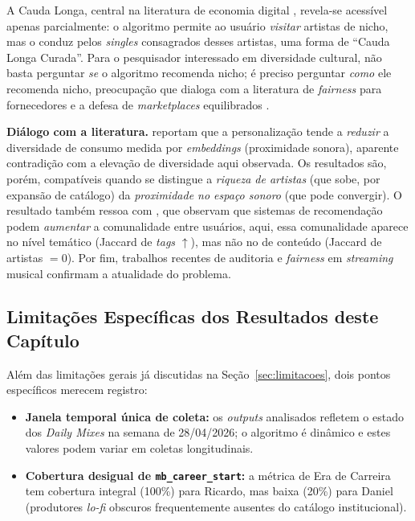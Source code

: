 \documentclass[12pt, %
openright,
oneside, %
a4paper,    %
english,   %
brazil]{facom-ufu-abntex2}
\begin{document}
A Cauda Longa, central na literatura de economia digital
\cite{anderson2006longtail}, revela-se acessível apenas parcialmente: o algoritmo
permite ao usuário \emph{visitar} artistas de nicho, mas o conduz pelos
\emph{singles} consagrados desses artistas, uma forma de ``Cauda Longa
Curada''. Para o pesquisador interessado em diversidade cultural, não basta
perguntar \emph{se} o algoritmo recomenda nicho; é preciso perguntar \emph{como}
ele recomenda nicho, preocupação que dialoga com a literatura de \emph{fairness}
para fornecedores e a defesa de \emph{marketplaces} equilibrados
\cite{mehrotra2018towards}.

\textbf{Diálogo com a literatura.}  reportam
que a personalização tende a \emph{reduzir} a diversidade de consumo medida por
\emph{embeddings} (proximidade sonora), aparente contradição com a elevação de
diversidade aqui observada. Os resultados são, porém, compatíveis quando se
distingue a \emph{riqueza de artistas} (que sobe, por expansão de catálogo) da
\emph{proximidade no espaço sonoro} (que pode convergir). O resultado também
ressoa com , que observam que sistemas de
recomendação podem \emph{aumentar} a comunalidade entre usuários, aqui, essa
comunalidade aparece no nível temático (Jaccard de \emph{tags} $\uparrow$), mas
não no de conteúdo (Jaccard de artistas $= 0$). Por fim, trabalhos recentes de
auditoria e \emph{fairness} em \emph{streaming} musical
\cite{turnbull2022exploring,matrosova2024recommender,shakespeare2025reframing}
confirmam a atualidade do problema.

\subsection{Limitações Específicas dos Resultados deste Capítulo}

Além das limitações gerais já discutidas na Seção~\ref{sec:limitacoes}, dois
pontos específicos merecem registro:

\begin{itemize}
  \item \textbf{Janela temporal única de coleta:} os \emph{outputs} analisados
  refletem o estado dos \emph{Daily Mixes} na semana de 28/04/2026; o algoritmo é
  dinâmico e estes valores podem variar em coletas longitudinais.
  \item \textbf{Cobertura desigual de \texttt{mb\_career\_start}:} a métrica de
  Era de Carreira tem cobertura integral (100\%) para Ricardo, mas baixa (20\%)
  para Daniel (produtores \emph{lo-fi} obscuros frequentemente ausentes do
  catálogo institucional).
\end{itemize}
\end{document}
